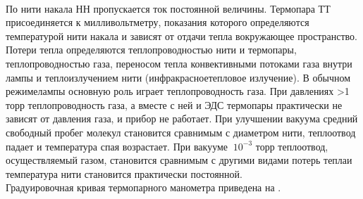 \documentclass[a4paper,12pt]{article}
\begin{document}
\\
По нити накала НН пропускается ток постоянной величины. Термопара ТТ присоединяется к милливольтметру,
показания которого определяются температурой нити накала и зависят от отдачи тепла вокружающее пространство.
Потери тепла определяются теплопроводностью нити и термопары, теплопроводностью газа, переносом тепла конвективными потоками газа внутри лампы и теплоизлучением нити (инфракрасноетепловое излучение).
В обычном режимелампы основную роль играет теплопроводность газа. При давлениях >1 торр теплопроводность газа, а вместе с ней и ЭДС термопары практически не зависят от давления газа,
и прибор не работает. При улучшении вакуума средний свободный пробег молекул становится сравнимым с диаметром нити, теплоотвод падает и температура спая возрастает. При вакууме $~10^{-3}$ торр
теплоотвод, осуществляемый газом, становится сравнимым с другими видами потерь теплаи температура
нити становится практически постоянной. \\
Градуировочная кривая термопарного манометра приведена на .
\end{document}
